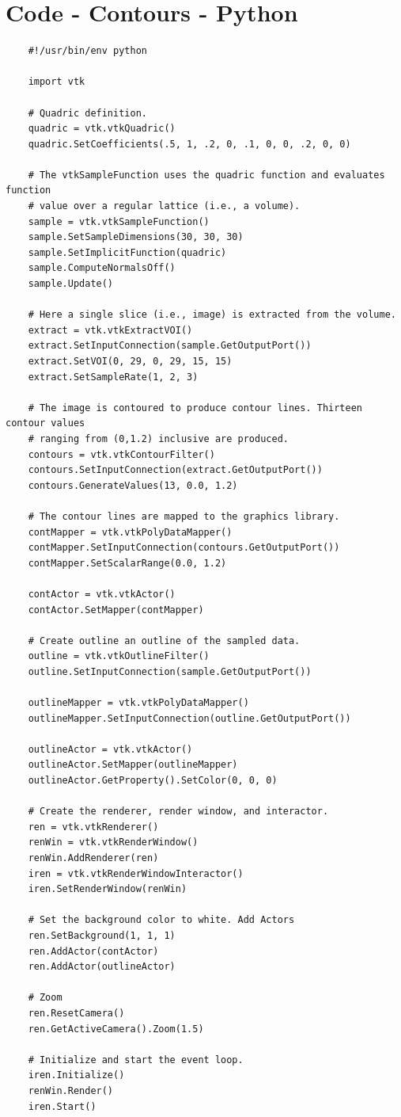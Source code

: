 \documentclass[11pt,a4paper,oneside]{article}
\begin{document}
    \section{Code - Contours - Python}
    \begin{verbatim}
    #!/usr/bin/env python
   
    import vtk
    
    # Quadric definition.
    quadric = vtk.vtkQuadric()
    quadric.SetCoefficients(.5, 1, .2, 0, .1, 0, 0, .2, 0, 0)
    
    # The vtkSampleFunction uses the quadric function and evaluates function
    # value over a regular lattice (i.e., a volume).
    sample = vtk.vtkSampleFunction()
    sample.SetSampleDimensions(30, 30, 30)
    sample.SetImplicitFunction(quadric)
    sample.ComputeNormalsOff()
    sample.Update()
    
    # Here a single slice (i.e., image) is extracted from the volume.
    extract = vtk.vtkExtractVOI()
    extract.SetInputConnection(sample.GetOutputPort())
    extract.SetVOI(0, 29, 0, 29, 15, 15)
    extract.SetSampleRate(1, 2, 3)
    
    # The image is contoured to produce contour lines. Thirteen contour values
    # ranging from (0,1.2) inclusive are produced.
    contours = vtk.vtkContourFilter()
    contours.SetInputConnection(extract.GetOutputPort())
    contours.GenerateValues(13, 0.0, 1.2)
    
    # The contour lines are mapped to the graphics library.
    contMapper = vtk.vtkPolyDataMapper()
    contMapper.SetInputConnection(contours.GetOutputPort())
    contMapper.SetScalarRange(0.0, 1.2)
    
    contActor = vtk.vtkActor()
    contActor.SetMapper(contMapper)
    
    # Create outline an outline of the sampled data.
    outline = vtk.vtkOutlineFilter()
    outline.SetInputConnection(sample.GetOutputPort())
    
    outlineMapper = vtk.vtkPolyDataMapper()
    outlineMapper.SetInputConnection(outline.GetOutputPort())
    
    outlineActor = vtk.vtkActor()
    outlineActor.SetMapper(outlineMapper)
    outlineActor.GetProperty().SetColor(0, 0, 0)
    
    # Create the renderer, render window, and interactor.
    ren = vtk.vtkRenderer()
    renWin = vtk.vtkRenderWindow()
    renWin.AddRenderer(ren)
    iren = vtk.vtkRenderWindowInteractor()
    iren.SetRenderWindow(renWin)
    
    # Set the background color to white. Add Actors
    ren.SetBackground(1, 1, 1)
    ren.AddActor(contActor)
    ren.AddActor(outlineActor)
    
    # Zoom
    ren.ResetCamera()
    ren.GetActiveCamera().Zoom(1.5)
    
    # Initialize and start the event loop.
    iren.Initialize()
    renWin.Render()
    iren.Start()
    \end{verbatim}
    
\end{document}
